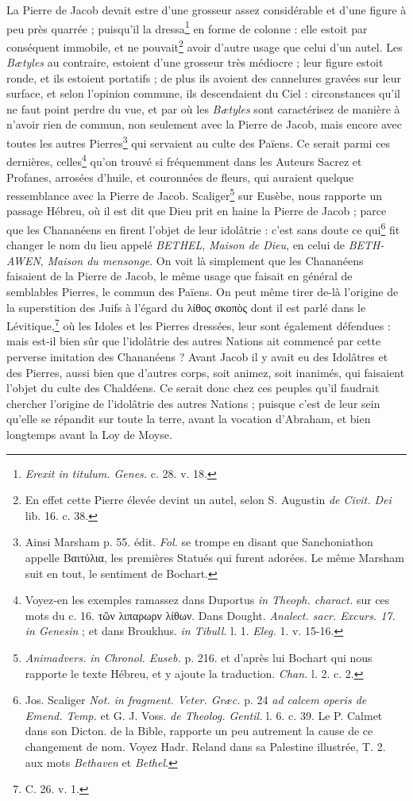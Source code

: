 \documentclass[a4paper, 11pt, oneside, polutonikogreek, french, landscape]{article}
\begin{document}
La Pierre de Jacob devait estre d'une grosseur assez considérable et d'une figure à peu près quarrée ; puisqu'il la dressa\footnote{\emph{Erexit in titulum. Genes.} c. 28. v. 18.} en forme de colonne : elle estoit par conséquent immobile, et ne pouvait\footnote{En effet cette Pierre élevée devint un autel, selon S. Augustin \emph{de Civit. Dei} lib. 16. c. 38.} avoir d'autre usage que celui d'un autel. Les \emph{Bætyles} au contraire, estoient d'une grosseur très médiocre ; leur figure estoit ronde, et ils estoient portatifs ; de plus ils avoient des cannelures gravées sur leur surface, et selon l'opinion commune, ils descendaient du Ciel : circonstances qu'il ne faut point perdre du vue, et par où les \emph{Bætyles} sont caractérisez de manière à n'avoir rien de commun, non seulement avec la Pierre de Jacob, mais encore avec toutes les autres Pierres\footnote{Ainsi Marsham p. 55. édit. \emph{Fol.} se trompe en disant que Sanchoniathon appelle Βαιτύλια, les premières Statués qui furent adorées. Le même Marsham suit en tout, le sentiment de Bochart.} qui servaient au culte des Païens. Ce serait parmi ces dernières, celles\footnote{Voyez-en les exemples ramassez dans Duportus \emph{in Theoph. charact.} sur ces mots du c. 16. τῶν λιπαρωρν λίθων. Dans Dought. \emph{Analect. sacr. Excurs. 17. in Genesin} ; et dans Broukhus. \emph{in Tibull.} l. 1. \emph{Eleg.} 1. v. 15-16.} qu'on trouvé si fréquemment dans les Auteurs Sacrez et Profanes, arrosées d'huile, et couronnées de fleurs, qui auraient quelque ressemblance avec la Pierre de Jacob. Scaliger\footnote{\emph{Animadvers. in Chronol. Euseb.} p. 216. et d'après lui Bochart qui nous rapporte le texte Hébreu, et y ajoute la traduction. \emph{Chan.} l. 2. c. 2.} sur Eusèbe, nous rapporte un passage Hébreu, où il est dit que Dieu prit en haine la Pierre de Jacob ; parce que les Chananéens en firent l'objet de leur idolâtrie : c'est sans doute ce qui\footnote{Jos. Scaliger \emph{Not. in fragment. Veter. Græc.} p. 24 \emph{ad calcem operis de Emend. Temp.} et G. J. Voss. \emph{de Theolog. Gentil.} l. 6. c. 39. Le P. Calmet dans son Dicton. de la Bible, rapporte un peu autrement la cause de ce changement de nom. Voyez Hadr. Reland dans sa Palestine illustrée, T. 2. aux mots \emph{Bethaven} et \emph{Bethel}.} fit changer le nom du lieu appelé \emph{BETHEL}, \emph{Maison de Dieu}, en celui de \emph{BETH-AWEN}, \emph{Maison du mensonge}. On voit là simplement que les Chananéens faisaient de la Pierre de Jacob, le même usage que faisait en général de semblables Pierres, le commun des Païens. On peut même tirer de-là l'origine de la superstition des Juifs à l'égard du λίθος σκοπὸς dont il est parlé dans le Lévitique,\footnote{C. 26. v. 1.} où les Idoles et les Pierres dressées, leur sont également défendues : mais est-il bien sûr que l'idolâtrie des autres Nations ait commencé par cette perverse imitation des Chananéens ? Avant Jacob il y avait eu des Idolâtres et des Pierres, aussi bien que d'autres corps, soit animez, soit inanimés, qui faisaient l'objet du culte des Chaldéens. Ce serait donc chez ces peuples qu'il faudrait chercher l'origine de l'idolâtrie des autres Nations ; puisque c'est de leur sein qu'elle se répandit sur toute la terre, avant la vocation d'Abraham, et bien longtemps avant la Loy de Moyse.
\end{document}
